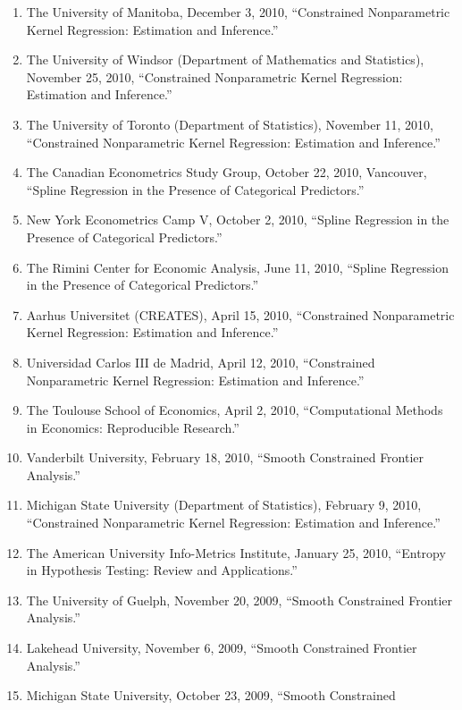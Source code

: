 \documentclass[
]{article}
\begin{document}
\begin{enumerate}
  Universidad de Zaragoza, March 3, 2011, ``Spline Regression in the
  Presence of Categorical Predictors.''
\item
  The University of Manitoba, December 3, 2010, ``Constrained
  Nonparametric Kernel Regression: Estimation and Inference.''
\item
  The University of Windsor (Department of Mathematics and Statistics),
  November 25, 2010, ``Constrained Nonparametric Kernel Regression:
  Estimation and Inference.''
\item
  The University of Toronto (Department of Statistics), November 11,
  2010, ``Constrained Nonparametric Kernel Regression: Estimation and
  Inference.''
\item
  The Canadian Econometrics Study Group, October 22, 2010, Vancouver,
  ``Spline Regression in the Presence of Categorical Predictors.''
\item
  New York Econometrics Camp V, October 2, 2010, ``Spline Regression in
  the Presence of Categorical Predictors.''
\item
  The Rimini Center for Economic Analysis, June 11, 2010, ``Spline
  Regression in the Presence of Categorical Predictors.''
\item
  Aarhus Universitet (CREATES), April 15, 2010, ``Constrained
  Nonparametric Kernel Regression: Estimation and Inference.''
\item
  Universidad Carlos III de Madrid, April 12, 2010, ``Constrained
  Nonparametric Kernel Regression: Estimation and Inference.''
\item
  The Toulouse School of Economics, April 2, 2010, ``Computational
  Methods in Economics: Reproducible Research.''
\item
  Vanderbilt University, February 18, 2010, ``Smooth Constrained
  Frontier Analysis.''
\item
  Michigan State University (Department of Statistics), February 9,
  2010, ``Constrained Nonparametric Kernel Regression: Estimation and
  Inference.''
\item
  The American University Info-Metrics Institute, January 25, 2010,
  ``Entropy in Hypothesis Testing: Review and Applications.''
\item
  The University of Guelph, November 20, 2009, ``Smooth Constrained
  Frontier Analysis.''
\item
  Lakehead University, November 6, 2009, ``Smooth Constrained Frontier
  Analysis.''
\item
  Michigan State University, October 23, 2009, ``Smooth Constrained

\end{enumerate}
\end{document}
